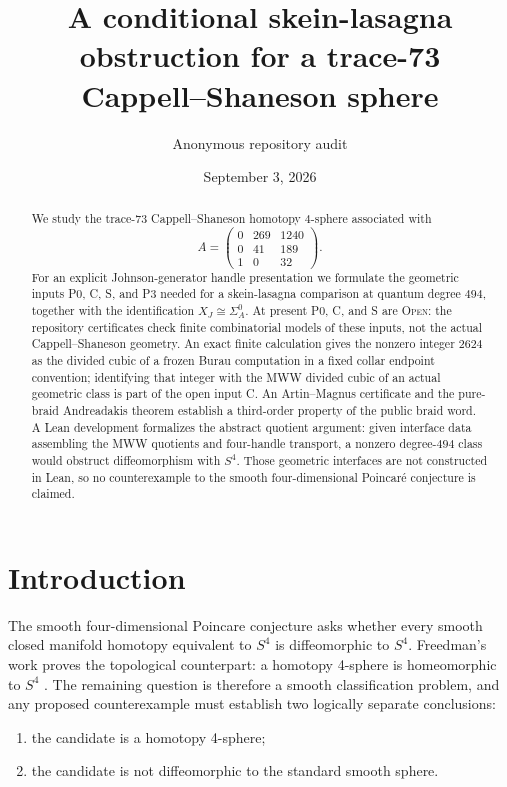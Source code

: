 \documentclass[11pt]{amsart}
\title[A conditional trace-73 obstruction]
{A conditional skein-lasagna obstruction for a trace-73\\
Cappell--Shaneson sphere}
\author{Anonymous repository audit}
\date{September 3, 2026}
\theoremstyle{definition}
\theoremstyle{remark}
\newcommand{\Open}{\textnormal{\textsc{Open}}}
\begin{document}
\begin{abstract}
We study the trace-73 Cappell--Shaneson homotopy $4$-sphere associated with
\[
A=\begin{pmatrix}0&269&1240\\0&41&189\\1&0&32\end{pmatrix}.
\]
For an explicit Johnson-generator handle presentation we formulate the
geometric inputs P0, C, S, and P3 needed for a skein-lasagna comparison at
quantum degree $494$, together with the identification $X_J\cong\Sigma_A^0$.
At present P0, C, and S are \Open: the repository certificates check finite
combinatorial models of these inputs, not the actual Cappell--Shaneson
geometry.  An exact finite calculation gives the nonzero integer $2624$ as
the divided cubic of a frozen Burau computation in a fixed collar endpoint
convention; identifying that integer with the MWW divided cubic of an actual
geometric class is part of the open input C.
An Artin--Magnus certificate and the pure-braid Andreadakis theorem
establish a third-order property of the public braid word.
A Lean development formalizes the abstract quotient argument: given interface
data assembling the MWW quotients and four-handle transport, a nonzero
degree-$494$ class would obstruct diffeomorphism with $S^4$.
Those geometric interfaces are not constructed in Lean, so no counterexample
to the smooth four-dimensional Poincar\'e conjecture is claimed.
\end{abstract}

\maketitle
\tableofcontents

\section{Introduction}

The smooth four-dimensional Poincare conjecture asks whether every smooth
closed manifold homotopy equivalent to $S^4$ is diffeomorphic to $S^4$.
Freedman's work proves the topological counterpart: a homotopy 4-sphere is
homeomorphic to $S^4$ \cite{Freedman1982}.  The remaining question is
therefore a smooth classification problem, and any proposed counterexample
must establish two logically separate conclusions:
\begin{enumerate}
\item the candidate is a homotopy 4-sphere;
\item the candidate is not diffeomorphic to the standard smooth sphere.
\end{enumerate}
\end{document}
